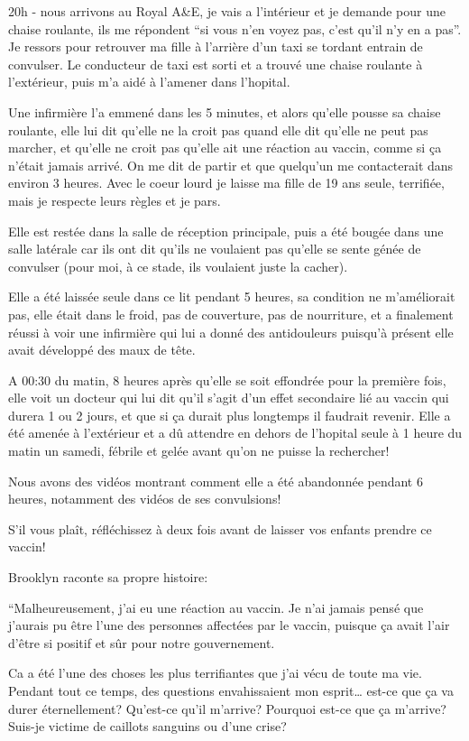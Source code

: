 {20h - nous arrivons au Royal A\&E, je vais a l'intérieur et je demande pour une
chaise roulante, ils me répondent “si vous n'en voyez pas, c'est qu'il n'y en a
pas”. Je ressors pour retrouver ma fille à l'arrière d'un taxi se tordant
entrain de convulser. Le conducteur de taxi est sorti et a trouvé une chaise
roulante à l'extérieur, puis m'a aidé à l'amener dans l'hopital.

Une infirmière l'a emmené dans les 5 minutes, et alors qu'elle pousse sa chaise
roulante, elle lui dit qu'elle ne la croit pas quand elle dit qu'elle ne peut
pas marcher, et qu'elle ne croit pas qu'elle ait une réaction au vaccin, comme
si ça n'était jamais arrivé. On me dit de partir et que quelqu'un me
contacterait dans environ 3 heures. Avec le coeur lourd je laisse ma fille de 19
ans seule, terrifiée, mais je respecte leurs règles et je pars.

Elle est restée dans la salle de réception principale, puis a été bougée dans
une salle latérale car ils ont dit qu'ils ne voulaient pas qu'elle se sente
génée de convulser (pour moi, à ce stade, ils voulaient juste la cacher).

Elle a été laissée seule dans ce lit pendant 5 heures, sa condition ne
m'améliorait pas, elle était dans le froid, pas de couverture, pas de
nourriture, et a finalement réussi à voir une infirmière qui lui a donné des
antidouleurs puisqu'à présent elle avait développé des maux de tête.

A 00:30 du matin, 8 heures après qu'elle se soit effondrée pour la première
fois, elle voit un docteur qui lui dit qu'il s'agit d'un effet secondaire lié au
vaccin qui durera 1 ou 2 jours, et que si ça durait plus longtemps il faudrait
revenir. Elle a été amenée à l'extérieur et a dû attendre en dehors de l'hopital
seule à 1 heure du matin un samedi, fébrile et gelée avant qu'on ne puisse la
rechercher!

Nous avons des vidéos montrant comment elle a été abandonnée pendant 6 heures,
notamment des vidéos de ses convulsions!

S'il vous plaît, réfléchissez à deux fois avant de laisser vos enfants prendre
ce vaccin!

Brooklyn raconte sa propre histoire:

“Malheureusement, j'ai eu une réaction au vaccin. Je n'ai jamais pensé que
j'aurais pu être l'une des personnes affectées par le vaccin, puisque ça avait
l'air d'être si positif et sûr pour notre gouvernement.

Ca a été l'une des choses les plus terrifiantes que j'ai vécu de toute ma
vie. Pendant tout ce temps, des questions envahissaient mon esprit… est-ce que
ça va durer éternellement? Qu'est-ce qu'il m'arrive? Pourquoi est-ce que ça
m'arrive? Suis-je victime de caillots sanguins ou d'une crise?

}
